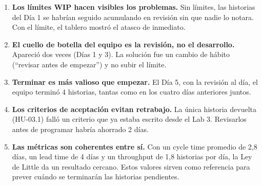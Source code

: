\documentclass[11pt,a4paper]{article}
\begin{document}
\begin{enumerate}
  \item \textbf{Los límites WIP hacen visibles los problemas.} Sin límites, las historias del Día 1 se habrían seguido acumulando en revisión sin que nadie lo notara. Con el límite, el tablero mostró el atasco de inmediato.
  \item \textbf{El cuello de botella del equipo es la revisión, no el desarrollo.} Apareció dos veces (Días 1 y 3). La solución fue un cambio de hábito (``revisar antes de empezar'') y no subir el límite.
  \item \textbf{Terminar es más valioso que empezar.} El Día 5, con la revisión al día, el equipo terminó 4 historias, tantas como en los cuatro días anteriores juntos.
  \item \textbf{Los criterios de aceptación evitan retrabajo.} La única historia devuelta (HU-03.1) falló un criterio que ya estaba escrito desde el Lab 3. Revisarlos antes de programar habría ahorrado 2 días.
  \item \textbf{Las métricas son coherentes entre sí.} Con un cycle time promedio de 2,8 días, un lead time de 4 días y un throughput de 1,8 historias por día, la Ley de Little da un resultado cercano. Estos valores sirven como referencia para prever cuándo se terminarán las historias pendientes.
\end{enumerate}
\end{document}

